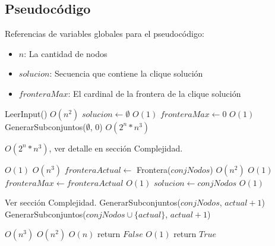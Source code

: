 \subsection{Pseudocódigo}

Referencias de variables globales para el pseudocódigo:
\begin{itemize}
    \item $n$: La cantidad de nodos
    \item $solucion$: Secuencia que contiene la clique solución
    \item $fronteraMax$: El cardinal de la frontera de la clique solución
\end{itemize}

\begin{algorithm}[H]
\begin{algorithmic}
    \State LeerInput()                  \Comment $O(n^2)$
    \State $solucion \gets \emptyset$   \Comment $O(1)$
    \State $fronteraMax \gets 0$        \Comment $O(1)$
    \State GenerarSubconjuntos($\emptyset$, $0$) \Comment $O(2^{n} * n^{3})$
\EndFunction
\end{algorithmic}
\end{algorithm}

\begin{algorithm}[H]
\begin{algorithmic}
 \Comment $O(2^{n} * n^{3})$, ver detalle en sección Complejidad.

                      \Comment $O(1)$
             \Comment $O(n^3)$
            \State $fronteraActual \gets$ Frontera($conjNodos$) \Comment $O(n^2)$
                      \Comment $O(1)$
                \State $fronteraMax \gets fronteraActual$ \Comment $O(1)$
                \State $solucion \gets conjNodos$         \Comment $O(1)$
            \EndIf
        \EndIf

    \Else \Comment Ver sección Complejidad.
        \State GenerarSubconjuntos($conjNodos$, $actual + 1$)
        \State GenerarSubconjuntos($conjNodos \cup \{actual\}$, $actual + 1$)
    \EndIf
\EndFunction
\end{algorithmic}
\end{algorithm}

\begin{algorithm}[H]
\begin{algorithmic}
                         \Comment $O(n^3)$
                         \Comment $O(n^2)$
              \Comment $O(n)$
                \State return $False$                   \Comment $O(1)$
            \EndIf
        \EndFor
    \EndFor
    \State return $True$
\EndFunction
\end{algorithmic}
\end{algorithm}

